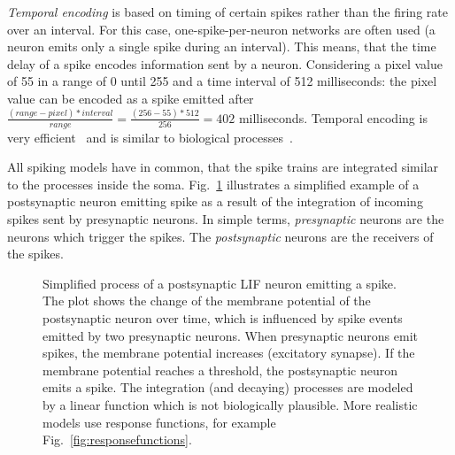 \textit{Temporal encoding} is based on timing of certain spikes rather than the firing rate over an interval.
For this case, one-spike-per-neuron networks are often used (a neuron emits only a single spike during an interval). 
This means, that the time delay of a spike encodes information sent by a neuron.
Considering a pixel value of 55 in a range of 0 until 255 and a time interval of 512 milliseconds:
the pixel value can be encoded as a spike emitted after \(\frac{(range-pixel)*{interval}}{range}=\frac{(256-55)*512}{256}=402\) milliseconds.
Temporal encoding is very efficient~\cite{pietrzak_overview_2023} and is similar to biological processes~\cite{maass_networks_1997}.

All spiking models have in common, that the spike trains are integrated similar to the processes inside the soma. 
Fig.~\ref{fig:simplifiedactivation} illustrates a simplified example of a postsynaptic neuron emitting spike as a result of the integration of incoming spikes sent by presynaptic neurons.
In simple terms, \textit{presynaptic} neurons are the neurons which trigger the spikes.
The \textit{postsynaptic} neurons are the receivers of the spikes. 

\begin{figure}
    \centering
    
    \caption[Simplified process of a postsynaptic \ac{LIF} emitting a spike]
    {Simplified process of a postsynaptic \ac{LIF} neuron emitting a spike. The plot shows the change of the membrane potential of the postsynaptic neuron over time, which is influenced by spike events emitted by two presynaptic neurons.
    When presynaptic neurons emit spikes, the membrane potential increases (excitatory synapse). 
    If the membrane potential reaches a threshold, the postsynaptic neuron emits a spike.
    The integration (and decaying) processes are modeled by a linear function which is not biologically plausible.
    More realistic models use response functions, for example Fig.~\ref{fig:responsefunctions}.
    }
   \label{fig:simplifiedactivation}
\end{figure}

